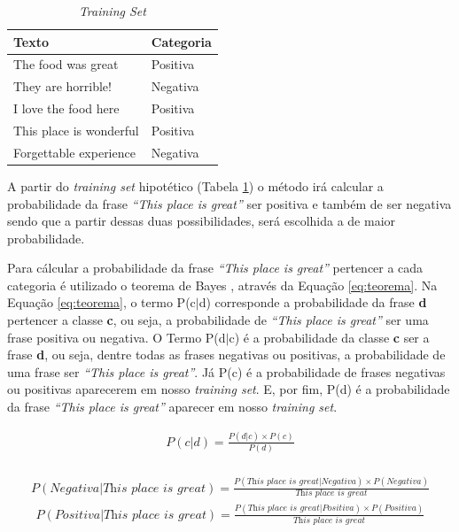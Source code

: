 \begin{table}[htb]
\centering
\begin{tabular}{|l|l|}
\hline
Texto  & Categoria \\ \hline
The food was great  & Positiva     \\ \hline
They are horrible!    & Negativa     \\ \hline
I love the food here  & Positiva     \\ \hline
This place is wonderful  & Positiva     \\ \hline
Forgettable experience  & Negativa     \\ \hline
\end{tabular}
\caption{\textit{Training Set}}
\label{tab:trainingsetnb}
\end{table}

A partir do \textit{training set} hipotético (Tabela
\ref{tab:trainingsetnb}) o método irá calcular a probabilidade da frase
\textit{``This place is great''} ser positiva e também de ser negativa sendo que
a partir dessas duas possibilidades, será escolhida a de maior probabilidade.

Para cálcular a probabilidade da frase \textit{``This place is great''}
pertencer a cada categoria é utilizado o teorema de Bayes \cite{manningschutze1999}, através da Equação
\ref{eq:teorema}. Na Equação \ref{eq:teorema}, o termo P(c$\vert$d) corresponde
a probabilidade da frase \textbf{d} pertencer a classe \textbf{c}, ou seja, a
probabilidade de \textit{``This place is great''} ser uma frase positiva ou negativa. O Termo P(d$\vert$c) é a probabilidade da
  classe \textbf{c} ser a frase \textbf{d}, ou seja, dentre todas as frases
  negativas ou positivas, a probabilidade de uma frase ser \textit{``This place
  is great''}. Já P(c) é a probabilidade de frases negativas ou positivas
  aparecerem em nosso \textit{training set}. E, por fim, P(d) é a probabilidade
  da frase \textit{``This place is great''} aparecer em nosso \textit{training
  set}.

\begin{equation}
\begin{gathered}
P(c|d) = \frac{P(d|c) \times P(c)}{P(d)} \\
\label{eq:teorema}
\end{gathered}
\end{equation}

\begin{equation}
\begin{gathered}
P(Negativa|\textit{This place is great})
=
\frac{P(\textit{This place is great}|Negativa) \times
P(Negativa)}{\textit{This place is great}}
\label{eq:teoreman1}
\end{gathered}
\end{equation}
\begin{equation}
\begin{gathered}
P(Positiva|\textit{This place is great})
=
\frac{P(\textit{This place is great}|Positiva) \times
P(Positiva)}{\textit{This place is great}}
\label{eq:teoremap1}
\end{gathered}
\end{equation}



